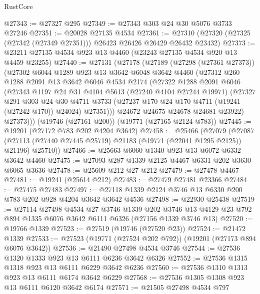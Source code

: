 \begin{lexlean}{RustCore}
\begin{coremodule}
@27343 := @27327 @295
@27349 := @27343 @303 @24 @30 @5076 @3733 @27246
@27351 := @20028 @27135 @4534
@27361 := @27310 (@27320 (@27325 (@27342 (@27349 @27351))) @26423 @26426 @26429 @26432 @23432)
@27373 := @23211 @27135 @4534 @923 @13 @4460 (@23243 @27135 @4534 @920 @13 @4459 @23255)
@27440 := @27131
    (@27178
      (@27189
        (@27298 (@27361 @27373))
        (@27302
          @6044
          @1289
          @923
          @13
          @3642
          @6048
          @3642
          @4460
          (@27312
            @260
            @1288
            @2091
            @13
            @3642
            @6046
            @4534
            @2174
            (@27322
              @1288
              @2091
              @6046
              (@27343
                @1197
                @24
                @31
                @4104
                @5613
                (@27240 @4104 @27244 @19971)
                (@27327
                  @291
                  @303
                  @24
                  @30
                  @4711
                  @3733
                  (@27237 @170 @24 @170 @4711 (@19241 (@27242 @170)) @24024)
                  @27351)))
            @24672
            @24675
            @24678
            @24681
            @23922)
          @27373)))
    (@19746 (@27161 @200))
    (@19771 (@27165 @2124 @783))
@27445 := @19201 (@27172 @783 @202 @4204 @3642)
@27458 := @25466
    (@27079
      (@27087 (@27113 (@27440 @27445 @25719) @21183 (@19771 (@22041 @1295 @2125)) @21196) @25710))
@27466 := @25663 @6060 @1340 @923 @13 @6072 @6332 @3642 @4460
@27475 := @27093 @287 @1339 @2125 @4467 @6331 @202 @3630 @6065 @3636
@27478 := @25609 @212 @27 @212
@27479 := @27478 @4467
@27481 := @19241 (@25614 @212)
@27483 := @27479 @27481 @23366
@27484 := @27475 @27483
@27497 := @27118 @1339 @2124 @3746 @13 @6330 @200 @783 @202 @928 @4204 @3642 @3642 @4536
@27498 := @22930 @25438
@27519 := @27114
    @27498
    @4534
    @27
    @3746
    @1339
    @202
    @3746
    @13
    @4129
    @23
    @792
    @894
    @1335
    @6076
    @3642
    @6111
    @6326
    (@27156 @1339 @3746 @13)
@27520 := @19766 @1339
@27523 := @27519 (@19746 (@27520 @23))
@27524 := @21472 @1339
@27533 := @27523 (@19771 (@27524 @202 @792)) (@19201 (@27173 @894 @6076 @3642))
@27536 := @21490 @27498 @4534 @3746
@27544 := @27536 @1320 @1333 @923 @13 @6111 @6236 @3642 @6326
@27552 := @27536 @1315 @1318 @923 @13 @6111 @6229 @3642 @6236
@27560 := @27536 @1310 @1313 @923 @13 @6111 @6174 @3642 @6229
@27568 := @27536 @1305 @1308 @923 @13 @6111 @6120 @3642 @6174
@27571 := @21505 @27498 @4534 @797

\end{coremodule}
\end{lexlean}
